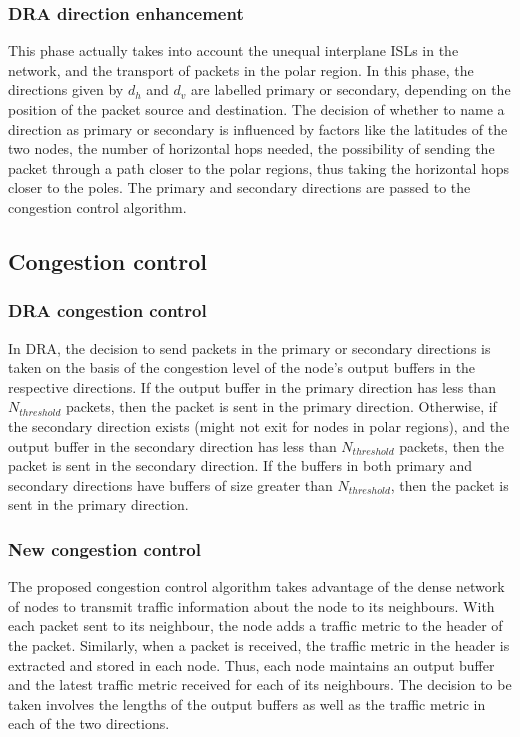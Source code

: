 \documentclass[10pt,conference, final, letterpaper]{IEEEtran}
\begin{document}
\subsubsection{DRA direction enhancement}
This phase actually takes into account the unequal interplane ISLs in the network, and the transport of packets in the polar region. In this phase, the directions given by $d_h$ and $d_v$ are labelled primary or secondary, depending on the position of the packet source and destination. The decision of whether to name a direction as primary or secondary is influenced by factors like the latitudes of the two nodes, the number of horizontal hops needed, the possibility of sending the packet through a path closer to the polar regions, thus taking the horizontal hops closer to the poles. The primary and secondary directions are passed to the congestion control algorithm.\\
\subsection{Congestion control}
\subsubsection{DRA congestion control}
In DRA, the decision to send packets in the primary or secondary directions is taken on the basis of the congestion level of the node's output buffers in the respective directions. If the output buffer in the primary direction has less than $N_{threshold}$ packets, then the packet is sent in the primary direction. Otherwise, if the secondary direction exists (might not exit for nodes in polar regions), and the output buffer in the secondary direction has less than $N_{threshold}$ packets, then the packet is sent in the secondary direction. If the buffers in both primary and secondary directions have buffers of size greater than $N_{threshold}$, then the packet is sent in the primary direction.
\subsubsection{New congestion control}

The proposed congestion control algorithm takes advantage of the dense network of nodes to transmit traffic information about the node to its neighbours. With each packet sent to its neighbour, the node adds a traffic metric to the header of the packet. Similarly, when a packet is received, the traffic metric in the header is extracted and stored in each node. Thus, each node maintains an output buffer and the latest traffic metric received for each of its neighbours. The decision to be taken involves the lengths of the output buffers as well as the traffic metric in each of the two directions.\\
\end{document}

